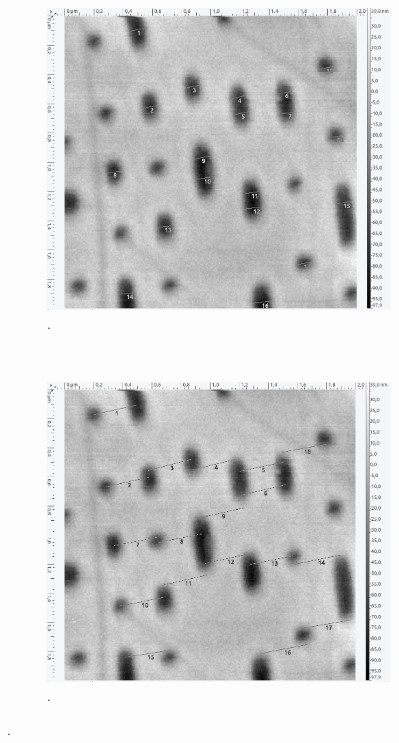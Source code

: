 \begin{figure}[H]
\centering
	\begin{subfigure}[t]{0.4\textwidth}
	\includegraphics[width=\textwidth]{AFM_auswertung/bluray_breite.png}
	\caption{.}
	\end{subfigure}
	~
	\begin{subfigure}[t]{0.4\textwidth}
	\includegraphics[width=\textwidth]{AFM_auswertung/bluray_abstand.png}
	\caption{.}

\end{subfigure}
\end{figure}
